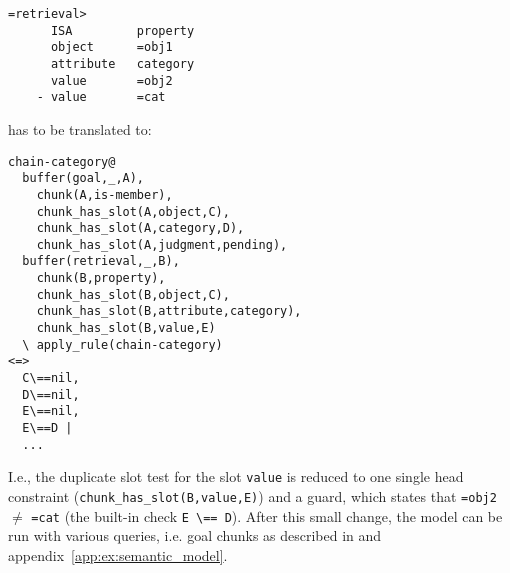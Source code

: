 \begin{lstlisting}
=retrieval>
      ISA         property
      object      =obj1
      attribute   category
      value       =obj2
    - value       =cat 
\end{lstlisting}

has to be translated to:

\begin{lstlisting}
chain-category@
  buffer(goal,_,A),
    chunk(A,is-member),
    chunk_has_slot(A,object,C),
    chunk_has_slot(A,category,D),
    chunk_has_slot(A,judgment,pending),
  buffer(retrieval,_,B),
    chunk(B,property),
    chunk_has_slot(B,object,C),
    chunk_has_slot(B,attribute,category),
    chunk_has_slot(B,value,E)
  \ apply_rule(chain-category) 
<=> 
  C\==nil,
  D\==nil,
  E\==nil,
  E\==D |
  ...
\end{lstlisting}

I.e., the duplicate slot test for the slot \lstinline|value| is reduced to one single head constraint (\lstinline|chunk_has_slot(B,value,E)|) and a guard, which states that \lstinline|=obj2| $\neq$ \lstinline|=cat| (the built-in check \lstinline|E \== D|). After this small change, the model can be run with various queries, i.e. goal chunks as described in \cite[unit 1, pp. 24\psqq]{actr_tutorial} and appendix~\ref{app:ex:semantic_model}.


